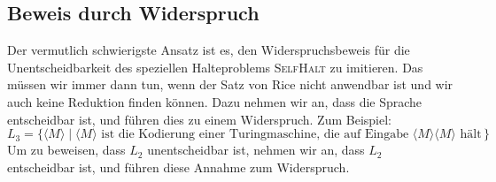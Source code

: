 \documentclass[a4paper,11pt,oneside,ngerman]{scrartcl}
\begin{document}
\subsection{Beweis durch Widerspruch}

Der vermutlich schwierigste Ansatz ist es, den Widerspruchsbeweis für die Unentscheidbarkeit des speziellen Halteproblems \textsc{SelfHalt} zu imitieren.
Das müssen wir immer dann tun, wenn der Satz von Rice nicht anwendbar ist und wir auch keine Reduktion finden können.
Dazu nehmen wir an, dass die Sprache entscheidbar ist, und führen dies zu einem Widerspruch. Zum Beispiel:
\[
    L_3 = \Big\{\langle M\rangle\;\big|\; \text{$\langle M\rangle$ ist die Kodierung einer Turingmaschine, die auf Eingabe $\langle M\rangle\langle M\rangle$ hält}\,\Big\}
\]
Um zu beweisen, dass $L_2$ unentscheidbar ist, nehmen wir an, dass $L_2$ entscheidbar ist, und führen diese Annahme zum Widerspruch.
\end{document}
